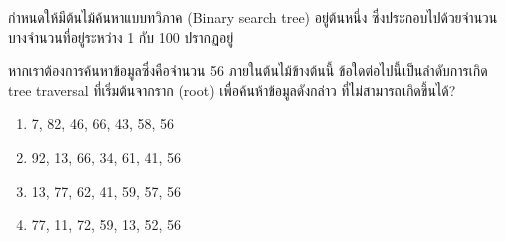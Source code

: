 \question{}

กำหนดให้มีต้นไม้ค้นหาแบบทวิภาค (Binary search tree) อยู่ต้นหนึ่ง 
ซึ่งประกอบไปด้วยจำนวนบางจำนวนที่อยู่ระหว่าง 1 กับ 100 ปรากฏอยู่

หากเราต้องการค้นหาข้อมูลซึ่งคือจำนวน 56 ภายในต้นไม้ข้างต้นนี้\;
ข้อใดต่อไปนี้เป็นลำดับการเกิด tree traversal ที่เริ่มต้นจากราก (root) เพื่อค้นห้าข้อมูลดังกล่าว
ที่ไม่สามารถเกิดขึ้นได้?

\begin{multicols}{2}
\begin{enumerate}[label={$\Circle$}]
\item 7, 82, 46, 66, 43, 58, 56
\item 92, 13, 66, 34, 61, 41, 56
\item 13, 77, 62, 41, 59, 57, 56
\item 77, 11, 72, 59, 13, 52, 56
\end{enumerate}
\end{multicols}
